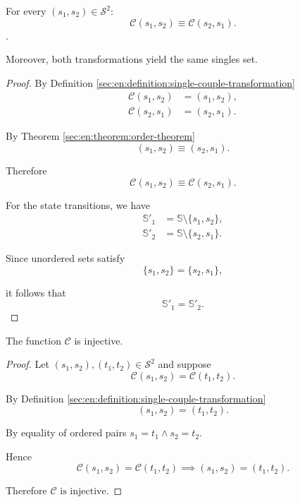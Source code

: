 \begin{proposition}
    \begin{statement}
        For every $(s_1,s_2)\in\mathcal S^2$:
        $$\mathcal C(s_1,s_2)\equiv\mathcal C(s_2,s_1).$$.

        Moreover, both transformations yield the same singles set.
    \end{statement}
    \begin{proof}
        By Definition \ref{sec:en:definition:single-couple-transformation}
        \begin{align*}
            \mathcal C(s_1,s_2)&=(s_1,s_2),\\
            \mathcal C(s_2,s_1)&=(s_2,s_1).
        \end{align*}

        By Theorem \ref{sec:en:theorem:order-theorem}
        $$(s_1,s_2)\equiv(s_2,s_1).$$

        Therefore
        $$\mathcal C(s_1,s_2)\equiv\mathcal C(s_2,s_1).$$

        For the state transitions, we have
        \begin{align*}
            \mathbb S'_1&=\mathbb S\setminus\{s_1,s_2\},\\
            \mathbb S'_2&=\mathbb S\setminus\{s_2,s_1\}.
        \end{align*}

        Since unordered sets satisfy
        $$\{s_1,s_2\}=\{s_2,s_1\},$$

        it follows that
        $$\mathbb S'_1=\mathbb S'_2.$$
    \end{proof}
\end{proposition}

\begin{proposition}
    \begin{statement}
        The function $\mathcal C$ is injective.
    \end{statement}
   
    \begin{proof}
        Let $(s_1,s_2),(t_1,t_2)\in\mathcal S^2$ and suppose
        $$\mathcal C(s_1,s_2)=\mathcal C(t_1,t_2).$$

        By Definition \ref{sec:en:definition:single-couple-transformation}
        $$(s_1,s_2)=(t_1,t_2).$$

        By equality of ordered pairs $s_1=t_1\land s_2=t_2.$

        Hence
        $$\mathcal C(s_1,s_2)=\mathcal C(t_1,t_2)
        \implies
        (s_1,s_2)=(t_1,t_2).$$

        Therefore $\mathcal C\text{ is injective}.$
    \end{proof}
\end{proposition}


